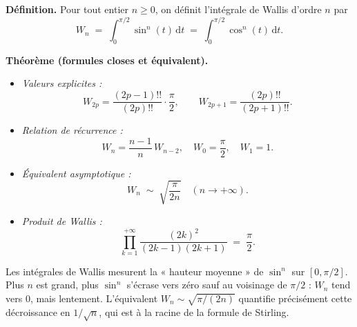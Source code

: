 ﻿%


\newcommand{\Wn}{W_n}
\newcommand{\intz}{\int_0^{\pi/2}}


\begin{tcolorbox}[thmbox]
  \textbf{Définition.}\enspace{}
  Pour tout entier $n \geq 0$, on définit l'intégrale de Wallis d'ordre $n$ par
  \[
    \Wn \;=\; \intz \sin^n(t)\,\mathrm{d}t \;=\; \intz \cos^n(t)\,\mathrm{d}t.
  \]

  \medskip
  \textbf{Théorème (formules closes et équivalent).}
  \begin{itemize}
    \item \textit{Valeurs explicites :}
    \[
      W_{2p} = \frac{(2p-1)!!}{(2p)!!}\cdot\frac{\pi}{2}, \qquad
      W_{2p+1} = \frac{(2p)!!}{(2p+1)!!}.
    \]
    \item \textit{Relation de récurrence :}
    \[
      \Wn = \frac{n-1}{n}\,W_{n-2}, \quad W_0 = \frac{\pi}{2},\quad W_1 = 1.
    \]
    \item \textit{Équivalent asymptotique :}
    \[
      \Wn \;\sim\; \sqrt{\frac{\pi}{2n}} \quad (n \to +\infty).
    \]
    \item \textit{Produit de Wallis :}
    \[
      \prod_{k=1}^{+\infty} \frac{{(2k)}^2}{(2k-1)(2k+1)} \;=\; \frac{\pi}{2}.
    \]
  \end{itemize}
\end{tcolorbox}

\begin{significationintuitive}
Les intégrales de Wallis mesurent la « hauteur moyenne » de $\sin^n$ sur
$[0,\pi/2]$. Plus $n$ est grand, plus $\sin^n$ s'écrase vers zéro sauf au
voisinage de $\pi/2$ : $W_n$ tend vers $0$, mais lentement. L'équivalent
$W_n \sim \sqrt{\pi/(2n)}$ quantifie précisément cette décroissance en
$1/\sqrt{n}$, qui est à la racine de la formule de Stirling.
\end{significationintuitive}

